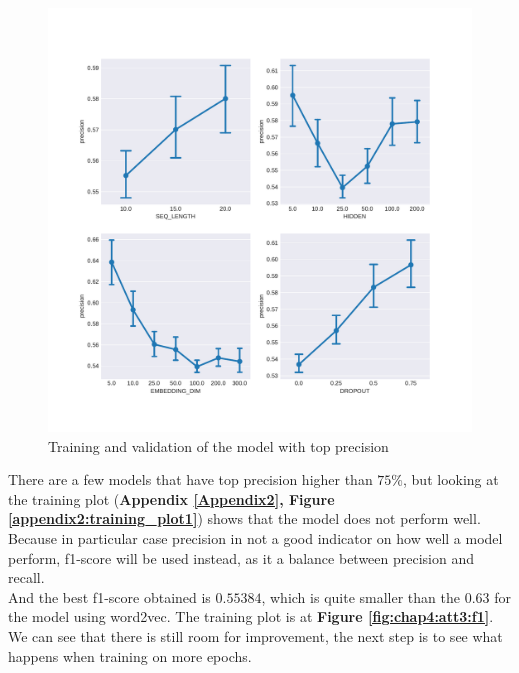 \begin{figure}
	\centering
	\includegraphics[width=\textwidth]{images/chapitre4/confInt_precision_liar_attention_200}
	\caption{Training and validation of the model with top precision}
	\label{fig:chap4:att3:confInt2}
\end{figure}

There are a few models that have top precision higher than $75\%$, but looking at the training plot (\textbf{Appendix \ref{Appendix2}, Figure \ref{appendix2:training_plot1}}) shows that the model does not perform well. Because in particular case precision in not a good indicator on how well a model perform, f1-score will be used instead, as it a balance between precision and recall. \\

And the best f1-score obtained is $0.55384$, which is quite smaller than the $0.63$ for the model using word2vec. The training plot is at \textbf{Figure \ref{fig:chap4:att3:f1}}. We can see that there is still room for improvement, the next step is to see what happens when training on more epochs. \\


